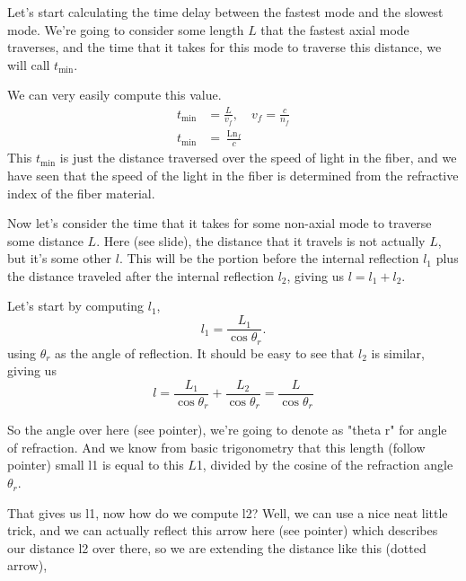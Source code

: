 Let's start calculating the time delay between the fastest mode and the slowest mode. We're going to consider some length $L$ that the fastest axial mode traverses, and the time that it takes for this mode to traverse this distance, we will call $t_{\mathrm{min}}$.

We can very easily compute this value.
\begin{equation}
\begin{aligned}
t_{\min } &=\frac{L}{v_f}, \quad v_f=\frac{c}{n_f} \\
t_{\min } &=\frac{\operatorname{Ln}_f}{c}
\end{aligned}
\end{equation}
This $t_{\mathrm{min}}$ is just the distance traversed over the speed of light in the fiber, and we have seen that the speed of the light in the fiber is determined from the refractive index of the fiber material.

Now let's consider the time that it takes for some non-axial mode to traverse some distance $L$. Here (see slide), the distance that it travels is not actually $L$, but it's some other $l$. This will be the portion before the internal reflection $l_1$ plus the distance traveled after the internal reflection $l_2$, giving us $l = l_1 + l_2$.

Let's start by computing $l_1$,
\begin{equation}
l_1=\frac{L_1}{\cos \theta_r}.
\end{equation}
using $\theta_r$ as the angle of reflection. It should be easy to see that $l_2$ is similar, giving us
\begin{equation}
l=\frac{L_1}{\cos \theta_r}+\frac{L_2}{\cos \theta_r}=\frac{L}{\cos \theta_r}
\end{equation}

So the angle over here (see pointer), we're going to denote as "theta r" for angle of refraction. And we know from basic trigonometry that this length (follow pointer) small l1 is equal to this $L$1, divided by the cosine of the refraction angle $\theta_r$.

That gives us l1, now how do we compute l2? Well, we can use a nice neat little trick, and we can actually reflect this arrow here (see pointer) which describes our distance l2 over there, so we are extending the distance like this (dotted arrow),

